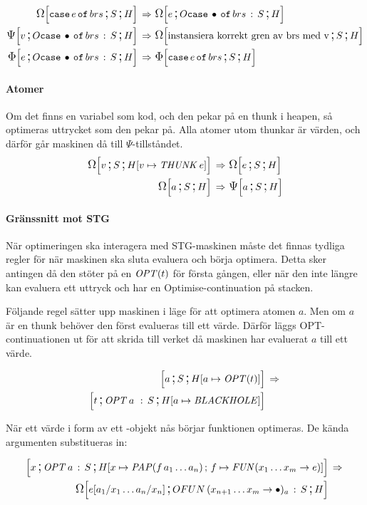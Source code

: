 \documentclass[../Optimise]{subfiles}
\begin{document}
\begin{align}
\label{CBV:CaseOmg} \OMEGA SH{\eCase e{brs}} \rulesep &\, \OMEGA{\oCase{brs}S}He\\
\label{CBV:CasePsi} \PSI{\oCase{brs}S}Hv \rulesep &\, \OMEGA SH{\text{instansiera korrekt gren av brs med v}} \\
\label{CBV:CaseIrr} \IRR{\oCase{brs}S}He \rulesep &\, \IRR SH{\eCase e brs}
\end{align}


\paragraph{Atomer}
Om det finns en variabel som kod, och den pekar på en thunk i heapen, så optimeras
uttrycket som den pekar på. Alla atomer utom thunkar är värden, och därför går maskinen
då till $\Psi$-tillståndet.
\begin{align}
\OMEGA S{\heap{v}{\THUNK{e}}}v \rulesep &\, \OMEGA SHe \\
\OMEGA SHa \rulesep &\, \PSI SHa
\end{align}


\paragraph{Gränssnitt mot STG}
När optimeringen ska interagera med STG-maskinen måste det finnas tydliga regler
för när maskinen ska sluta evaluera och börja optimera. Detta sker
antingen då den stöter på en $\OPT t$ för första gången, eller när den
inte längre kan evaluera ett uttryck och har en Optimise-continuation
på stacken.

Följande regel sätter upp maskinen i läge för att optimera atomen $a$. Men om $a$
är en thunk behöver den först evalueras till ett värde. Därför läggs
OPT-continuationen ut för att skrida till verket då maskinen har evaluerat
$a$ till ett värde.

\begin{align}
\mc aS{\heap a{\OPT t}} & \rulesep\\
\mc t{\cOPT{a\,}S}{\heap a{\BH}} \nonumber
\end{align}

När ett värde i form av ett -objekt nås börjar funktionen optimeras. 
De kända argumenten substitueras in:

\begin{align}
\mc x{\cOPT aS}{\heapp x{\PAP f{a_{1}\ldots a_{n}}}f{\FUN{x_{1}\ldots x_{m}}e}} & \rulesep\\
\OMEGA{\cOFUN{x_{n+1}\ldots x_{m}}aS}H{e[a_{1}/x_{1}\ldots a_{n}/x_{n}]} \nonumber
\end{align}
\end{document}
